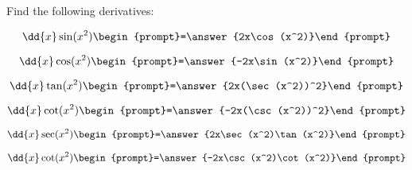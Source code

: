 \documentclass{ximera}
\author{Bobby Ramsey}
\begin{document}
\begin{exercise}
Find the following derivatives:

\[
\dd{x}\sin(x^2) 
\begin{prompt}=\answer{2x\cos(x^2)}\end{prompt}
\]

\[
\dd{x}\cos(x^2) 
\begin{prompt}=\answer{-2x\sin(x^2)}\end{prompt}
\]

\[
\dd{x}\tan(x^2) 
\begin{prompt}=\answer{2x(\sec(x^2))^2}\end{prompt}
\]

\[
\dd{x}\cot(x^2) 
\begin{prompt}=\answer{-2x(\csc(x^2))^2}\end{prompt}
\]

\[
\dd{x}\sec(x^2) 
\begin{prompt}=\answer{2x\sec(x^2)\tan(x^2)}\end{prompt}
\]

\[
\dd{x}\cot(x^2) 
\begin{prompt}=\answer{-2x\csc(x^2)\cot(x^2)}\end{prompt}
\]

\end{exercise}
\end{document}
